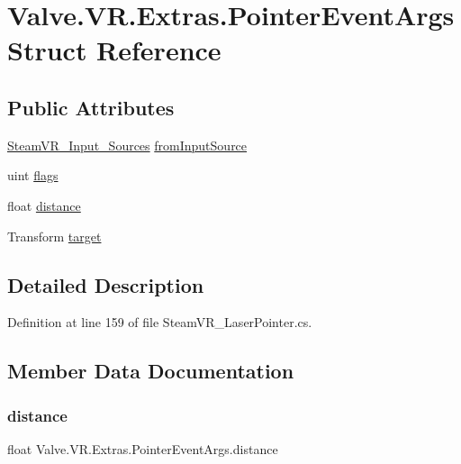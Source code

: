 \hypertarget{struct_valve_1_1_v_r_1_1_extras_1_1_pointer_event_args}{}\section{Valve.\+V\+R.\+Extras.\+Pointer\+Event\+Args Struct Reference}
\label{struct_valve_1_1_v_r_1_1_extras_1_1_pointer_event_args}
\subsection*{Public Attributes}
\begin{DoxyCompactItemize}
\item 
\mbox{\hyperlink{namespace_valve_1_1_v_r_a82e5bf501cc3aa155444ee3f0662853f}{Steam\+V\+R\+\_\+\+Input\+\_\+\+Sources}} \mbox{\hyperlink{struct_valve_1_1_v_r_1_1_extras_1_1_pointer_event_args_a80f9c03f66b8ce98780088b7e824dc0c}{from\+Input\+Source}}
\item 
uint \mbox{\hyperlink{struct_valve_1_1_v_r_1_1_extras_1_1_pointer_event_args_a3ef5a343968b21c5e88611bc3381172f}{flags}}
\item 
float \mbox{\hyperlink{struct_valve_1_1_v_r_1_1_extras_1_1_pointer_event_args_a17a4f67946da8af0efc55d8fd904168c}{distance}}
\item 
Transform \mbox{\hyperlink{struct_valve_1_1_v_r_1_1_extras_1_1_pointer_event_args_a1fbaa36b05f278adb3e4193f53b0a847}{target}}
\end{DoxyCompactItemize}


\subsection{Detailed Description}


Definition at line 159 of file Steam\+V\+R\+\_\+\+Laser\+Pointer.\+cs.



\subsection{Member Data Documentation}
\mbox{\label{struct_valve_1_1_v_r_1_1_extras_1_1_pointer_event_args_a17a4f67946da8af0efc55d8fd904168c}} 
\subsubsection{\texorpdfstring{distance}{distance}}
{\footnotesize\ttfamily float Valve.\+V\+R.\+Extras.\+Pointer\+Event\+Args.\+distance}



